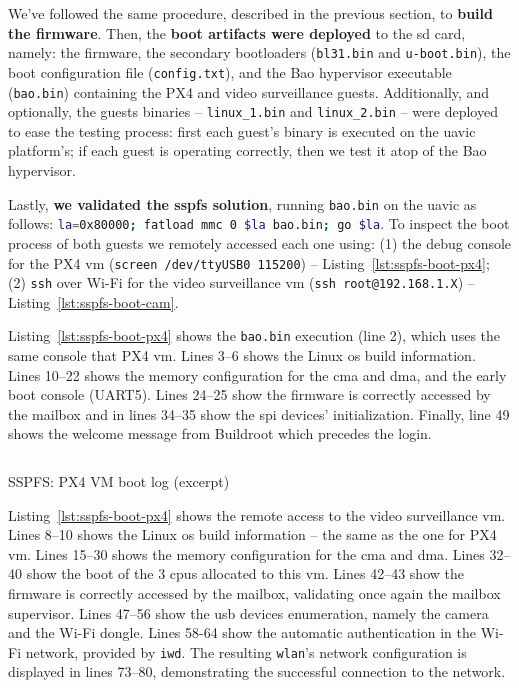 We've followed the same procedure, described in the previous section, to
\textbf{build the firmware}. Then, the \textbf{boot artifacts were deployed} to the
\gls{sd} card, namely: the firmware, the secondary bootloaders
(\lstinline{bl31.bin} and \lstinline{u-boot.bin}), the boot
configuration file (\lstinline{config.txt}), and the Bao hypervisor executable
(\lstinline{bao.bin}) containing the PX4 and video surveillance
guests. Additionally, and optionally, the guests binaries --
\lstinline{linux_1.bin} and \lstinline{linux_2.bin} -- were deployed to ease the
testing process: first each guest's binary is executed on the \gls{uavic}
platform's; if each guest is operating correctly, then we test it atop of the
Bao hypervisor.

Lastly, \textbf{we validated the \gls{sspfs} solution}, running \lstinline{bao.bin} on
the \gls{uavic} as follows:
\lstinline[language=bash]{la=0x80000; fatload mmc 0 $la bao.bin; go $la}.
To inspect the boot process of both guests we remotely accessed each one using:
(1) the debug console for the PX4 \gls{vm}
(\lstinline{screen /dev/ttyUSB0 115200}) -- Listing~\ref{lst:sspfs-boot-px4};
(2) \texttt{ssh} over Wi-Fi for the video surveillance \gls{vm}
(\lstinline{ssh root@192.168.1.X}) -- Listing~\ref{lst:sspfs-boot-cam}.

Listing~\ref{lst:sspfs-boot-px4} shows the \lstinline{bao.bin} execution (line 2),
which uses the same console that PX4 \gls{vm}. Lines 3--6 shows the Linux
\gls{os} build information. Lines 10--22 shows the memory configuration for the
\gls{cma} and \gls{dma}, and the early boot console (UART5). Lines 24--25 show
the firmware is correctly accessed by the mailbox and in lines 34--35 show the
\gls{spi} devices' initialization. Finally, line 49 shows the welcome message
from Buildroot which precedes the login.

\begin{longlisting}
\centering
\inputminted[]{kconfig}{./listing/sspfs-boot-px4.txt}
\caption{SSPFS: PX4 VM boot log (excerpt)}
\label{lst:sspfs-boot-px4}
\end{longlisting}

Listing~\ref{lst:sspfs-boot-px4} shows the remote access to the video
surveillance \gls{vm}. Lines 8--10 shows the Linux
\gls{os} build information -- the same as the one for PX4 \gls{vm}. Lines 15--30 shows the memory configuration for the
\gls{cma} and \gls{dma}. Lines 32--40 show the boot of the 3 \glspl{cpu}
allocated to this \gls{vm}.
Lines 42--43 show the firmware is correctly accessed by the mailbox, validating
once again the mailbox supervisor.
Lines 47--56 show the \gls{usb} devices enumeration, namely the camera and the
Wi-Fi dongle. Lines 58-64 show the automatic authentication in the Wi-Fi
network, provided by \texttt{iwd}. The resulting \texttt{wlan}'s network
configuration is displayed in lines 73--80, demonstrating the successful
connection to the network.

